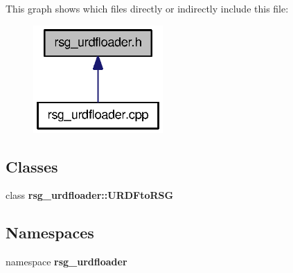\-This graph shows which files directly or indirectly include this file\-:\nopagebreak
\begin{figure}[H]
\begin{center}
\leavevmode
\includegraphics[width=140pt]{rsg__urdfloader_8h__dep__incl}
\end{center}
\end{figure}
\subsection*{\-Classes}
\begin{DoxyCompactItemize}
\item 
class {\bf rsg\-\_\-urdfloader\-::\-U\-R\-D\-Fto\-R\-S\-G}
\end{DoxyCompactItemize}
\subsection*{\-Namespaces}
\begin{DoxyCompactItemize}
\item 
namespace {\bf rsg\-\_\-urdfloader}
\end{DoxyCompactItemize}
